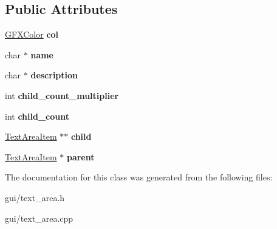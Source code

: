 \subsection*{Public Attributes}
\begin{DoxyCompactItemize}
\item 
\hyperlink{structGFXColor}{G\+F\+X\+Color} {\bfseries col}\hypertarget{classTextAreaItem_a7f627447012fc919c1cf71cdd4bbb81b}{}\label{classTextAreaItem_a7f627447012fc919c1cf71cdd4bbb81b}

\item 
char $\ast$ {\bfseries name}\hypertarget{classTextAreaItem_a6d449f2f4d4f5ee5ebd1b00b3be4e814}{}\label{classTextAreaItem_a6d449f2f4d4f5ee5ebd1b00b3be4e814}

\item 
char $\ast$ {\bfseries description}\hypertarget{classTextAreaItem_a4c93579e6b6d9e12a9bf68cb02b03259}{}\label{classTextAreaItem_a4c93579e6b6d9e12a9bf68cb02b03259}

\item 
int {\bfseries child\+\_\+count\+\_\+multiplier}\hypertarget{classTextAreaItem_a2bbc0b4c9ff4bbdc3b84947eaf0a45a0}{}\label{classTextAreaItem_a2bbc0b4c9ff4bbdc3b84947eaf0a45a0}

\item 
int {\bfseries child\+\_\+count}\hypertarget{classTextAreaItem_ad7480fec8b590fa0f6a4c309c0bf4bf0}{}\label{classTextAreaItem_ad7480fec8b590fa0f6a4c309c0bf4bf0}

\item 
\hyperlink{classTextAreaItem}{Text\+Area\+Item} $\ast$$\ast$ {\bfseries child}\hypertarget{classTextAreaItem_a9964295a0e0c22068510112123f80e59}{}\label{classTextAreaItem_a9964295a0e0c22068510112123f80e59}

\item 
\hyperlink{classTextAreaItem}{Text\+Area\+Item} $\ast$ {\bfseries parent}\hypertarget{classTextAreaItem_a49fe79bd824de564a40a40d3948a3ba5}{}\label{classTextAreaItem_a49fe79bd824de564a40a40d3948a3ba5}

\end{DoxyCompactItemize}


The documentation for this class was generated from the following files\+:\begin{DoxyCompactItemize}
\item 
gui/text\+\_\+area.\+h\item 
gui/text\+\_\+area.\+cpp\end{DoxyCompactItemize}

